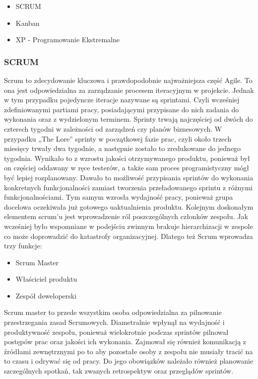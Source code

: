 \documentclass[oneside,polski,logo]{amuthesis}
\begin{document}
\begin{itemize}
	\item SCRUM
	\item Kanban
	\item XP - Programowanie Ekstremalne \\
\end{itemize}

\subsubsection{SCRUM}

Scrum to zdecydowanie kluczowa i prawdopodobnie najważniejsza część Agile. To ona jest odpowiedzialna za zarządzanie procesem iteracyjnym w projekcie. Jednak w tym przypadku pojedyncze iteracje nazywane są sprintami. Czyli wcześniej zdefiniowanymi partiami pracy, posiadającymi przypisane do nich zadania do wykonania oraz z wydzielonym terminem. Sprinty trwają najczęściej od dwóch do czterech tygodni w zależności od zarządzeń czy planów biznesowych. W przypadku „The Lore” sprinty w początkowej fazie prac, czyli około trzech miesięcy trwały dwa tygodnie, a następnie zostało to zredukowane do jednego tygodnia. Wynikało to z wzrostu jakości otrzymywanego produktu, ponieważ był on częściej oddawany w ręce testerów, a także sam proces programistyczny mógł być lepiej rozplanowany. Dawało to możliwość przypisania sprintów do wykonania konkretnych funkcjonalności zamiast tworzenia przeładowanego sprintu z różnymi funkcjonalnościami. Tym samym wzrosła wydajność pracy, ponieważ grupa docelowa oczekiwała już gotowego uaktualnienia produktu. Kolejnym doskonałym elementem scrum’u jest wprowadzenie ról poszczególnych członków zespołu. Jak wcześniej było wspomniane w podejściu zwinnym brakuje hierarchizacji w zespole co może doprowadzić do katastrofy organizacyjnej.\cite{agileHunt} Dlatego też Scrum wprowadza trzy funkcje:

\begin{itemize}
	\item Scrum Master
	\item Właściciel produktu
	\item Zespół deweloperski \\
\end{itemize}

Scrum master to przede wszystkim osoba odpowiedzialna za pilnowanie przestrzegania zasad Scrumowych. Diametralnie wpłynął na wydajność i produktywność zespołu, ponieważ wielokrotnie podczas sprintów pilnował postępów prac oraz jakości ich wykonania. Zajmował się również komunikacją z źródłami zewnętrznymi po to aby pozostałe osoby z zespołu nie musiały tracić na to czasu i odrywać się od pracy. Do jego obowiązków należało również planowanie szczególnych spotkań, tak zwanych retrospektyw oraz przeglądów sprintów. \\
\end{document}
